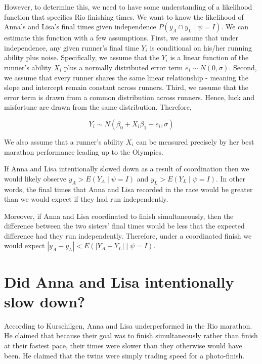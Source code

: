 \documentclass[12pt,titlepage]{article}
\begin{document}
However, to determine this, we need to have some understanding of a
likelihood function that specifies Rio finishing times. We want to
know the likelihood of Anna's and Lisa's final times given
independence $P(y_A \cap y_L \mid \psi = I )$. We can estimate this
function with a few assumptions. First, we assume that under
independence, any given runner's final time $Y_i$ is conditional on
his/her running ability plus noise. Specifically, we assume that the
$Y_i$ is a linear function of the runner's ability $X_i$ plus a
normally distributed error term $e_i \sim N(0, \sigma)$. Second, we
assume that every runner shares the same linear relationship - meaning
the slope and intercept remain constant across runners. Third, we
assume that the error term is drawn from a common distribution across
runners. Hence, luck and misfortune are drawn from the same
distribution. Therefore,

$$Y_i \sim N(\beta_0 + X_{i}\beta_1 + e_i, \sigma)$$

We also assume that a runner's ability $X_i$ can be measured precisely
by her best marathon performance leading up to the Olympics. 


If Anna and Lisa intentionally slowed down as a result of coordination
then we would likely observe $y_A > E(Y_A \mid \psi = I) $ and
$y_L > E(Y_L\mid \psi = I )$. In other words, the final times that
Anna and Lisa recorded in the race would be greater than we would
expect if they had run independently.

Moreover, if Anna and Lisa coordinated to finish simultaneously, then
the difference between the two sisters' final times would be less that
the expected difference had they run independently. Therefore, under a
coordinated finish we would expect $\left|y_A - y_L\right| < E(\left|Y_A - Y_L\right| \mid \psi = I )$.

\section*{Did Anna and Lisa intentionally slow down?}

According to Kurschilgen, Anna and Lisa underperformed in the Rio marathon. He claimed that because their goal was to finish simultaneously rather than finish at their fastest pace, their times were slower than they otherwise would have been.  He claimed that the twins were simply trading speed for a photo-finish.
\end{document}
